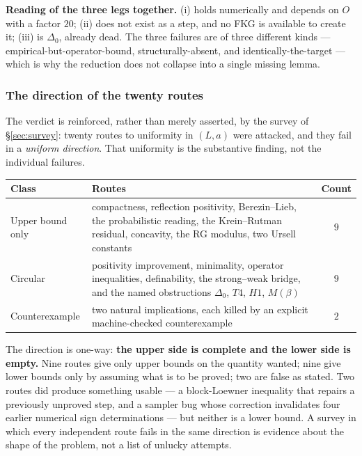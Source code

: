 \begin{v3box}
\textbf{Reading of the three legs together.} (i) holds numerically and depends on $O$ with a factor
$20$; (ii) does not exist as a step, and no FKG is available to create it; (iii) is $\Delta_0$,
already dead. The three failures are of three different kinds --- empirical-but-operator-bound,
structurally-absent, and identically-the-target --- which is why the reduction does not collapse
into a single missing lemma.
\end{v3box}


\subsubsection*{The direction of the twenty routes}

The verdict is reinforced, rather than merely asserted, by the survey of \S\ref{sec:survey}: twenty
routes to uniformity in $(L, a)$ were attacked, and they fail in a \emph{uniform direction}. That
uniformity is the substantive finding, not the individual failures.

\begin{center}
\small
\begin{tabularx}{\textwidth}{@{}l X c@{}}
\toprule
\textbf{Class} & \textbf{Routes} & \textbf{Count} \\
\midrule
Upper bound only & compactness, reflection positivity, Berezin--Lieb, the probabilistic reading,
the Krein--Rutman residual, concavity, the RG modulus, two Ursell constants & $9$ \\
Circular & positivity improvement, minimality, operator inequalities, definability, the
strong--weak bridge, and the named obstructions $\Delta_0$, $T4$, $H1$, $M(\beta)$ & $9$ \\
Counterexample & two natural implications, each killed by an explicit machine-checked
counterexample & $2$ \\
\bottomrule
\end{tabularx}
\end{center}

\noindent The direction is one-way: \textbf{the upper side is complete and the lower side is
empty.} Nine routes give only upper bounds on the quantity wanted; nine give lower bounds only by
assuming what is to be proved; two are false as stated. Two routes did produce something usable ---
a block-Loewner inequality that repairs a previously unproved step, and a sampler bug whose
correction invalidates four earlier numerical sign determinations --- but neither is a lower bound.
A survey in which every independent route fails in the same direction is evidence about the shape
of the problem, not a list of unlucky attempts.

